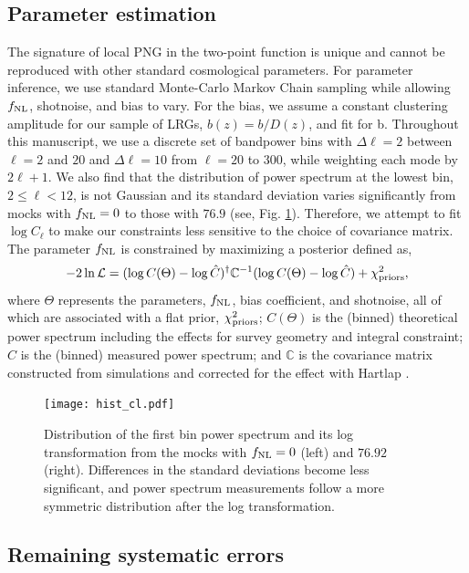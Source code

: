 \subsection{Parameter estimation}
The signature of local PNG in the two-point function is unique and cannot be reproduced with other standard cosmological parameters. For parameter inference, we use standard Monte-Carlo Markov Chain sampling while allowing $f_{\rm NL}$, shotnoise, and bias to vary. For the bias, we assume a constant clustering amplitude for our sample of LRGs, $b(z) = b/D(z)$, and fit for b. Throughout this manuscript, we use a discrete set of bandpower bins with $\Delta\ell=2$ between $\ell=2$ and $20$ and $\Delta \ell=10$ from $\ell=20$ to $300$, while weighting each mode by $2\ell+1$. We also find that the distribution of power spectrum at the lowest bin, $2\leq \ell < 12$,  is not Gaussian and its standard deviation varies significantly from mocks with $f_{\rm NL}=0$ to those with $76.9$ (see, Fig. \ref{fig:histcell}). Therefore, we attempt to fit $\log C_{\ell}$ to make our constraints less sensitive to the choice of covariance matrix. The parameter $f_{\rm NL}$ is constrained by maximizing a posterior defined as,
\begin{equation}
-2\ln\mathcal{L} = (\log C(\Theta)-\log \hat{C})^{\dagger} \mathbb{C}^{-1} (\log C(\Theta)-\log \hat{C}) + \chi^{2}_{\rm priors},
\end{equation}
where $\Theta$ represents the parameters, $f_{\rm NL}$, bias coefficient, and shotnoise, all of which are associated with a flat prior, $\chi^{2}_{\rm priors}$; $C(\Theta)$ is the (binned) theoretical power spectrum including the effects for survey geometry and integral constraint; $\hat{C}$ is the (binned) measured power spectrum; and $\mathbb{C}$ is the covariance matrix constructed from simulations and corrected for the effect with Hartlap . 

\begin{figure}
\centering
\texttt{[image: hist\_cl.pdf]}
\caption{Distribution of the first bin power spectrum and its log transformation from the mocks with $f_{\rm NL}=0$ (left) and $76.92$ (right). Differences in the standard deviations become less significant, and power spectrum measurements follow a more symmetric distribution after the log transformation.}\label{fig:histcell}
\end{figure}


\subsection{Remaining systematic errors}
\label{ssec:characterization}

